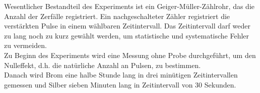 Wesentlicher Bestandteil des Experiments ist ein Geiger-Müller-Zählrohr, das die Anzahl der Zerfälle registriert. Ein nachgeschalteter Zähler registriert die verstärkten Pulse in einem wählbaren Zeitintervall. Das Zeitintervall darf weder zu lang noch zu kurz gewählt werden, um statistische und systematische Fehler zu vermeiden. \\
Zu Beginn des Experiments wird eine Messung ohne Probe durchgeführt, um den Nulleffekt, d.h. die natürliche Anzahl an Pulsen, zu bestimmen. \\
Danach wird Brom eine halbe Stunde lang in drei minütigen Zeitintervallen gemessen und Silber sieben Minuten lang in Zeitintervall von 30 Sekunden.

